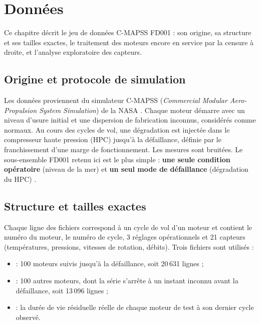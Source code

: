 \chapter{Données}\label{sec:donnees}

\chapintro

Ce chapitre décrit le jeu de données C-MAPSS FD001 : son origine, sa structure et ses tailles exactes, le traitement des moteurs encore en service par la censure à droite, et l'analyse exploratoire des capteurs.

\section{Origine et protocole de simulation}\label{sec:donnees-origine}

Les données proviennent du simulateur C-MAPSS (\emph{Commercial Modular Aero-Propulsion System Simulation}) de la NASA \cite{saxena2008damage}. Chaque moteur démarre avec un niveau d'usure initial et une dispersion de fabrication inconnus, considérés comme normaux. Au cours des cycles de vol, une dégradation est injectée dans le compresseur haute pression (HPC) jusqu'à la défaillance, définie par le franchissement d'une marge de fonctionnement. Les mesures sont bruitées. Le sous-ensemble FD001 retenu ici est le plus simple : \textbf{une seule condition opératoire} (niveau de la mer) et \textbf{un seul mode de défaillance} (dégradation du HPC) \cite{saxena2008data}.

\section{Structure et tailles exactes}\label{sec:donnees-structure}

Chaque ligne des fichiers correspond à un cycle de vol d'un moteur et contient le numéro du moteur, le numéro de cycle, 3 réglages opérationnels et 21 capteurs (températures, pressions, vitesses de rotation, débits). Trois fichiers sont utilisés :

\begin{itemize}
\item {} : 100 moteurs suivis jusqu'à la défaillance, soit 20\,631 lignes ;
\item {} : 100 autres moteurs, dont la série s'arrête à un instant inconnu avant la défaillance, soit 13\,096 lignes ;
\item {} : la durée de vie résiduelle réelle de chaque moteur de test à son dernier cycle observé.
\end{itemize}

